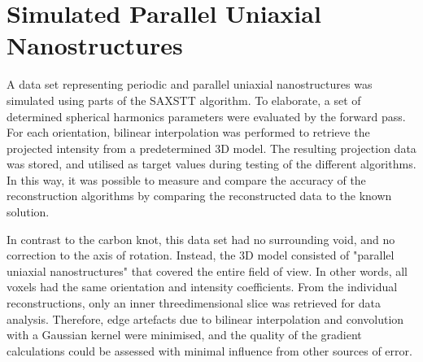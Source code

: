 \section{Simulated Parallel Uniaxial Nanostructures} %
\label{sec:reconstruction_data_sets_periodic_parallel_uniaxial_nanostructures}
A data set representing periodic and parallel uniaxial nanostructures was simulated using parts of the SAXSTT algorithm.
To elaborate, a set of determined spherical harmonics parameters were evaluated by the forward pass.
For each orientation, bilinear interpolation was performed to retrieve the projected intensity from a predetermined 3D model.
The resulting projection data was stored, and utilised as target values during testing of the different algorithms.
In this way, it was possible to measure and compare the accuracy of the reconstruction algorithms by comparing the reconstructed data to the known solution.%

In contrast to the carbon knot, this data set had no surrounding void, and no correction to the axis of rotation.
Instead, the 3D model consisted of "parallel uniaxial nanostructures" that covered the entire field of view.
In other words, all voxels had the same orientation and intensity coefficients.
From the individual reconstructions, only an inner threedimensional slice was retrieved for data analysis.
Therefore, edge artefacts due to bilinear interpolation and convolution with a Gaussian kernel were minimised,
and the quality of the gradient calculations could be assessed with minimal influence from other sources of error.




